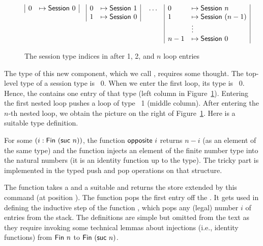 \documentclass[acmsmall,screen]{acmart}
\begin{document}
\begin{figure}[tp]
  \begin{align*}
    &
      \begin{array}[t]{|ll|}
        0 &\mapsto \ASession~0
      \end{array}
    &&
      \begin{array}[t]{|ll|}
        0 &\mapsto \ASession~1 \\
        1 &\mapsto \ASession~0
      \end{array}
          &&
             \dots
    &&
       \begin{array}[t]{|ll|}
         0 & \mapsto \ASession~n \\
         1 & \mapsto \ASession~(n-1) \\
           & \vdots \\
         n-1 & \mapsto \ASession~0
       \end{array}
  \end{align*}
  \caption{The session type indices in {\ACommandStack} after 1, 2, and $n$ loop entries}
  \label{fig:commandstore}
\end{figure}
The type of this new
component, which we call {\ACommandStack}, requires some thought.  The top-level type of a session type is
{\ASession~0}. When we enter the first loop, its type is {\ASession~0}. Hence, the {\ACommandStack} contains
one entry of that type (left column in Figure~\ref{fig:commandstore}).
Entering the first nested loop pushes a loop of type {\ASession~1}
(middle column). After entering the $n$-th nested loop, we obtain the
picture on the right of Figure~\ref{fig:commandstore}. Here is a
suitable type definition.
\rstCommandStack

For some $(i : \AFin~(\Asuc~ n))$, the function
$\AgdaFunction{opposite}~i$ returns $n-i$ (as an element of the same
type) and the function {\AtoN} injects an element of the finite number
type into the natural numbers (it is an identity function up to the type). The tricky part is implemented in the
typed push and pop operations on that structure.
\rstPops

The  function takes a {\ACommandStack} and a
suitable {\ACommand} and returns the store extended by this command
(at position {\Azero}). 
The  function pops the first entry off the
{\ACommandStack}. It gets used in defining the inductive step of the
function , which pops any (legal) number $i$ of entries
from the stack. The definitions are simple but omitted from the text
as they require invoking some technical lemmas about injections (i.e.,
identity functions) from $\AFin~n$ to $\AFin~(\Asuc~n)$.
\end{document}
